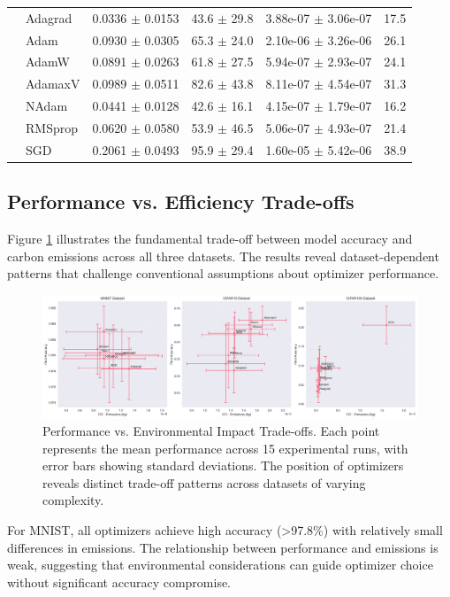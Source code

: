 \documentclass[conference]{IEEEtran}
\begin{document}
\begin{table}[htbp]
\begin{tabular}{@{}llcccr@{}}
& Adagrad & 0.0336 $\pm$ 0.0153 & 43.6 $\pm$ 29.8 & 3.88e-07 $\pm$ 3.06e-07 & 17.5 \\
& Adam & 0.0930 $\pm$ 0.0305 & 65.3 $\pm$ 24.0 & 2.10e-06 $\pm$ 3.26e-06 & 26.1 \\
& AdamW & 0.0891 $\pm$ 0.0263 & 61.8 $\pm$ 27.5 & 5.94e-07 $\pm$ 2.93e-07 & 24.1 \\
& AdamaxV & 0.0989 $\pm$ 0.0511 & 82.6 $\pm$ 43.8 & 8.11e-07 $\pm$ 4.54e-07 & 31.3 \\
& NAdam & 0.0441 $\pm$ 0.0128 & 42.6 $\pm$ 16.1 & 4.15e-07 $\pm$ 1.79e-07 & 16.2 \\
& RMSprop & 0.0620 $\pm$ 0.0580 & 53.9 $\pm$ 46.5 & 5.06e-07 $\pm$ 4.93e-07 & 21.4 \\
& SGD & 0.2061 $\pm$ 0.0493 & 95.9 $\pm$ 29.4 & 1.60e-05 $\pm$ 5.42e-06 & 38.9 \\
\bottomrule
\end{tabular}
\end{table}

\subsection{Performance vs. Efficiency Trade-offs}

Figure \ref{fig:accuracy_vs_emissions} illustrates the fundamental trade-off between model accuracy and carbon emissions across all three datasets. The results reveal dataset-dependent patterns that challenge conventional assumptions about optimizer performance.

\begin{figure}[htbp]
\centering
\includegraphics[width=\textwidth]{../results/plots/accuracy_vs_emissions.png}
\caption{Performance vs. Environmental Impact Trade-offs. Each point represents the mean performance across 15 experimental runs, with error bars showing standard deviations. The position of optimizers reveals distinct trade-off patterns across datasets of varying complexity.}
\label{fig:accuracy_vs_emissions}
\end{figure}

For MNIST, all optimizers achieve high accuracy (>97.8\%) with relatively small differences in emissions. The relationship between performance and emissions is weak, suggesting that environmental considerations can guide optimizer choice without significant accuracy compromise.
\end{document}
